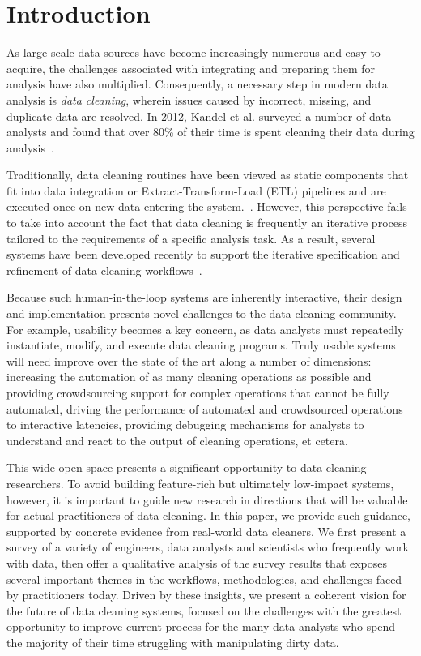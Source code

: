 \section{Introduction}
As large-scale data sources have become increasingly numerous and easy to acquire, the challenges associated with integrating and preparing them for analysis have also multiplied.
Consequently, a necessary step in modern data analysis is \textit{data cleaning}, wherein issues caused by incorrect, missing, and duplicate data are resolved.
In 2012, Kandel et al. surveyed a number of data analysts and found that over 80\% of their time is spent cleaning their data during analysis~\cite{kandel2012}.

Traditionally, data cleaning routines have been viewed as static components that fit into data integration or Extract-Transform-Load (ETL) pipelines and are executed once on new data entering the system.~\cite{apachefalcon, informatica, talend, nadeef}.
However, this perspective fails to take into account the fact that data cleaning is frequently an iterative process tailored to the requirements of a specific analysis task.
As a result, several systems have been developed recently to support the iterative specification and refinement of data cleaning workflows~\cite{trifacta, 2011-wrangler, openrefine, wisteria}.

Because such human-in-the-loop systems are inherently interactive, their design and implementation presents novel challenges to the data cleaning community.
For example, usability becomes a key concern, as data analysts must repeatedly instantiate, modify, and execute data cleaning programs.
Truly usable systems will need improve over the state of the art along a number of dimensions: increasing the automation of as many cleaning operations as possible and providing crowdsourcing support for complex operations that cannot be fully automated, driving the performance of automated and crowdsourced operations to interactive latencies, providing debugging mechanisms for analysts to understand and react to the output of cleaning operations, et cetera.

This wide open space presents a significant opportunity to data cleaning researchers.
 To avoid building feature-rich but ultimately low-impact systems, however, it is important to guide new research in directions that will be valuable for actual practitioners of data cleaning.
In this paper, we provide such guidance, supported by concrete evidence from real-world data cleaners.
We first present a survey of a variety of engineers, data analysts and scientists who frequently work with data, then offer a qualitative analysis of the survey results that exposes several important themes in the workflows, methodologies, and challenges faced by practitioners today.
Driven by these insights, we present a coherent vision for the future of data cleaning systems, focused on the challenges with the greatest opportunity to improve current process for the many data analysts who spend the majority of their time struggling with manipulating dirty data.

